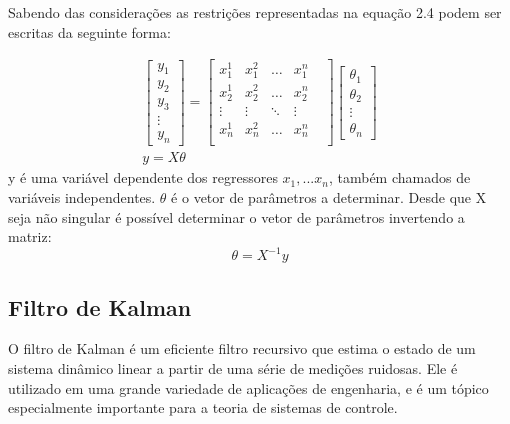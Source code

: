 Sabendo das considerações as restrições representadas na equação 2.4 podem ser escritas da seguinte forma:

\begin{equation}
\begin{array}{c}
\begin{bmatrix}
y_1 \\ y_2 \\ y_3\\ \vdots \\ y_n
\end{bmatrix}
=
\begin{bmatrix}
x^1_1 & x^2_1 & \dots & x^n_1\\
x^1_2 & x^2_2 & \dots & x^n_2\\
\vdots & \vdots & \ddots& \vdots&\\
x^1_n & x^2_n & \dots & x^n_n\\
\end{bmatrix}
\begin{bmatrix}
\theta_1 \\ \theta_2 \\ \vdots \\ \theta_n
\end{bmatrix}
\\
y=X \theta
\end{array}
\end{equation}
y é uma variável dependente  dos regressores $x_1,... x_n$, também chamados de variáveis independentes. $\theta$ é o vetor de parâmetros a determinar. Desde que X seja não singular é possível determinar o vetor de parâmetros invertendo a matriz:
\begin{equation}
\theta=X^{-1}y
\end{equation}


\subsection {Filtro de Kalman}
O filtro de Kalman é um eficiente filtro recursivo que estima o estado de um sistema dinâmico linear a partir de uma série de medições ruidosas. Ele é utilizado em uma grande variedade de aplicações de engenharia, e é um tópico especialmente importante para a teoria de sistemas de controle.
